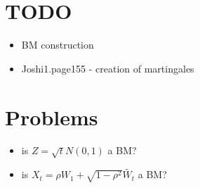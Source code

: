\section{TODO}
\begin{itemize}
	\item BM construction
	\item Joshi1.page155 - creation of martingales 
\end{itemize}


\section{Problems}
\begin{itemize}
	\item is $Z = \sqrt{t}N(0,1)$ a BM?
	\item is $X_{t} = \rho W_{1} + \sqrt{1 - \rho^{2}}\tilde{W_{t}}$ a BM?
\end{itemize}
